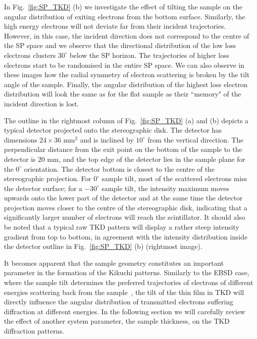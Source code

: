 In Fig.~\ref{fig:SP_TKD} (b) we investigate the effect of tilting the sample on the angular distribution of exiting electrons from the bottom surface. Similarly, the high energy electrons will not deviate far from their incident trajectories. However, in this case, the incident direction does not correspond to the centre of the SP space and we observe that the directional distribution of the low loss electrons clusters  $30^{\circ}$ below the SP horizon. The trajectories of higher loss electrons start to be randomised in the entire SP space. We can also observe in these images how the radial symmetry of electron scattering is broken by the tilt angle of the sample. Finally, the angular distribution of the highest loss electron distribution will look the same as for the flat sample as their ``memory" of the incident direction is lost.


The outline in the rightmost column of Fig.~\ref{fig:SP_TKD} (a) and (b) depicts a typical detector projected onto the stereographic disk.  The detector has dimensions $24\times 36$ mm$^2$ and is inclined by $10^{\circ}$ from the vertical direction.  The perpendicular distance from the exit point on the bottom of the sample to the detector is $20$ mm, and the top edge of the detector lies in the sample plane for the $0^{\circ}$ orientation.  The detector bottom is closest to the centre of the stereographic projection.  For $0^{\circ}$ sample tilt, most of the scattered electrons miss the detector surface; for a $-30^{\circ}$ sample tilt, the intensity maximum moves upwards onto the lower part of the detector and at the same time the detector projection moves closer to the centre of the stereographic disk, indicating that a significantly larger number of electrons will reach the scintillator.  It should also be noted that a typical raw TKD pattern will display a rather steep intensity gradient from top to bottom, in agreement with the intensity distribution inside the detector outline in Fig.~\ref{fig:SP_TKD} (b) (rightmost image).


It becomes apparent that the sample geometry constitutes an important parameter in the formation of the Kikuchi patterns. Similarly to the EBSD case, where the sample tilt determines the preferred trajectories of electrons of different energies scattering back from the sample~\cite{degraef2013e}, the tilt of the thin film in TKD will directly influence the angular distribution of transmitted electrons suffering diffraction at different energies. In the following section we will carefully review the effect of another system parameter, the sample thickness, on the TKD diffraction patterns. 
 
